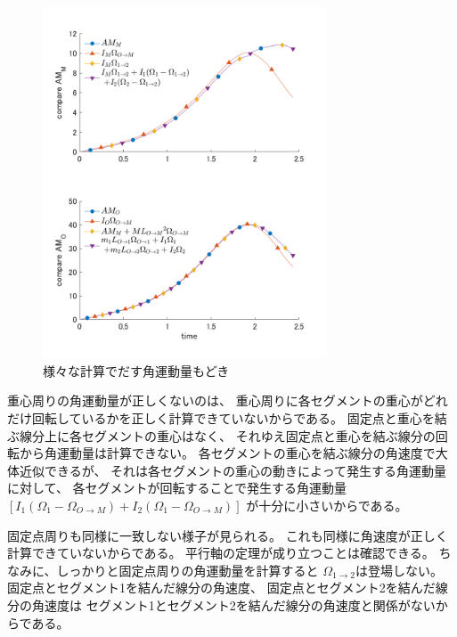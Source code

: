 \documentclass[a4paper,11pt]{jsarticle}
\begin{document}
\begin{figure}[b]
  \centering
  \includegraphics[width = 0.75\textwidth]{AM_compare.png}
  \caption{様々な計算でだす角運動量もどき}
  \label{AM_compare.png}
\end{figure}

重心周りの角運動量が正しくないのは、
重心周りに各セグメントの重心がどれだけ回転しているかを正しく計算できていないからである。
固定点と重心を結ぶ線分上に各セグメントの重心はなく、
それゆえ固定点と重心を結ぶ線分の回転から角運動量は計算できない。
各セグメントの重心を結ぶ線分の角速度で大体近似できるが、
それは各セグメントの重心の動きによって発生する角運動量に対して、
各セグメントが回転することで発生する角運動量
$\left[I_1(\Omega_1-\Omega_{O\rightarrow M})+I_2(\Omega_1-\Omega_{O\rightarrow M})\right]$
が十分に小さいからである。

固定点周りも同様に一致しない様子が見られる。
これも同様に角速度が正しく計算できていないからである。
平行軸の定理が成り立つことは確認できる。
ちなみに、しっかりと固定点周りの角運動量を計算すると
$\Omega_{1\rightarrow 2}$は登場しない。
固定点とセグメント1を結んだ線分の角速度、
固定点とセグメント2を結んだ線分の角速度は
セグメント1とセグメント2を結んだ線分の角速度と関係がないからである。
\end{document}
